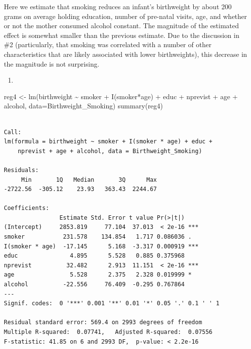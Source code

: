 \documentclass[
  letterpaper,
  DIV=11,
  numbers=noendperiod]{scrreprt}
\newenvironment{Shaded}{\begin{snugshade}}{\end{snugshade}}
\newcommand{\AttributeTok}[1]{\textcolor[rgb]{0.40,0.45,0.13}{#1}}
\newcommand{\FunctionTok}[1]{\textcolor[rgb]{0.28,0.35,0.67}{#1}}
\newcommand{\NormalTok}[1]{\textcolor[rgb]{0.00,0.23,0.31}{#1}}
\newcommand{\OtherTok}[1]{\textcolor[rgb]{0.00,0.23,0.31}{#1}}
\newcommand{\SpecialCharTok}[1]{\textcolor[rgb]{0.37,0.37,0.37}{#1}}
\providecommand{\tightlist}{%
  \setlength{\itemsep}{0pt}\setlength{\parskip}{0pt}}\usepackage{longtable,booktabs,array}
\begin{document}
Here we estimate that smoking reduces an infant's birthweight by about
200 grams on average holding education, number of pre-natal visits, age,
and whether or not the mother consumed alcohol constant. The magnitude
of the estimated effect is somewhat smaller than the previous estimate.
Due to the discussion in \#2 (particularly, that smoking was correlated
with a number of other characteristics that are likely associated with
lower birthweights), this decrease in the magnitude is not surprising.

\begin{enumerate}
\def\labelenumi{\arabic{enumi}.}
\setcounter{enumi}{3}
\tightlist
\item
\end{enumerate}

\begin{Shaded}
\begin{Highlighting}[]
\NormalTok{reg4 }\OtherTok{\textless{}{-}} \FunctionTok{lm}\NormalTok{(birthweight }\SpecialCharTok{\textasciitilde{}}\NormalTok{ smoker }\SpecialCharTok{+} \FunctionTok{I}\NormalTok{(smoker}\SpecialCharTok{*}\NormalTok{age) }\SpecialCharTok{+}\NormalTok{ educ }\SpecialCharTok{+}\NormalTok{ nprevist }\SpecialCharTok{+}\NormalTok{ age }\SpecialCharTok{+}\NormalTok{ alcohol,}
           \AttributeTok{data=}\NormalTok{Birthweight\_Smoking)}
\FunctionTok{summary}\NormalTok{(reg4)}
\end{Highlighting}
\end{Shaded}

\begin{verbatim}

Call:
lm(formula = birthweight ~ smoker + I(smoker * age) + educ + 
    nprevist + age + alcohol, data = Birthweight_Smoking)

Residuals:
     Min       1Q   Median       3Q      Max 
-2722.56  -305.12    23.93   363.43  2244.67 

Coefficients:
                Estimate Std. Error t value Pr(>|t|)    
(Intercept)     2853.819     77.104  37.013  < 2e-16 ***
smoker           231.578    134.854   1.717 0.086036 .  
I(smoker * age)  -17.145      5.168  -3.317 0.000919 ***
educ               4.895      5.528   0.885 0.375968    
nprevist          32.482      2.913  11.151  < 2e-16 ***
age                5.528      2.375   2.328 0.019999 *  
alcohol          -22.556     76.409  -0.295 0.767864    
---
Signif. codes:  0 '***' 0.001 '**' 0.01 '*' 0.05 '.' 0.1 ' ' 1

Residual standard error: 569.4 on 2993 degrees of freedom
Multiple R-squared:  0.07741,   Adjusted R-squared:  0.07556 
F-statistic: 41.85 on 6 and 2993 DF,  p-value: < 2.2e-16
\end{verbatim}
\end{document}
